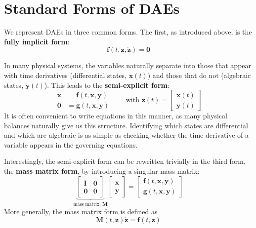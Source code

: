 \section{Standard Forms of DAEs}

We represent DAEs in three common forms. The first, as introduced above, is the \textbf{fully implicit form}:
\begin{equation}
    \mathbf{f}(t, \mathbf{z}, \dot{\mathbf{z}}) = \mathbf{0}
\end{equation}

In many physical systems, the variables naturally separate into those that appear with time derivatives (differential states, $\mathbf{x}(t)$) and those that do not (algebraic states, $\mathbf{y}(t)$). This leads to the \textbf{semi-explicit form}:
\begin{equation}
    \begin{aligned}
        \dot{\mathbf{x}} &= \mathbf{f}(t, \mathbf{x}, \mathbf{y}) \\
        \mathbf{0} &= \mathbf{g}(t, \mathbf{x}, \mathbf{y})
    \end{aligned}
    \qquad \text{with } \mathbf{z}(t) = \begin{bmatrix} \mathbf{x}(t) \\ \mathbf{y}(t) \end{bmatrix}
\end{equation}
It is often convenient to write equations in this manner, as many physical balances naturally give us this structure. Identifying which states are differential and which are algebraic is as simple as checking whether the time derivative of a variable appears in the governing equations.

Interestingly, the semi-explicit form can be rewritten trivially in the third form, the \textbf{mass matrix form}, by introducing a singular mass matrix:
\begin{equation}
    \underbrace{\begin{bmatrix} \mathbf{I} & \mathbf{0} \\ \mathbf{0} & \mathbf{0} \end{bmatrix}}_{\text{mass matrix, }\mathbf{M}} \begin{bmatrix} \dot{\mathbf{x}} \\ \dot{\mathbf{y}} \end{bmatrix} = \begin{bmatrix} \mathbf{f}(t, \mathbf{x}, \mathbf{y}) \\ \mathbf{g}(t, \mathbf{x}, \mathbf{y}) \end{bmatrix}
\end{equation}
More generally, the mass matrix form is defined as
\begin{equation}
    \mathbf{M}(t, \mathbf{z})\dot{\mathbf{z}} = \mathbf{f}(t, \mathbf{z})
    \label{eq:dae_mass_matrix}
\end{equation}


